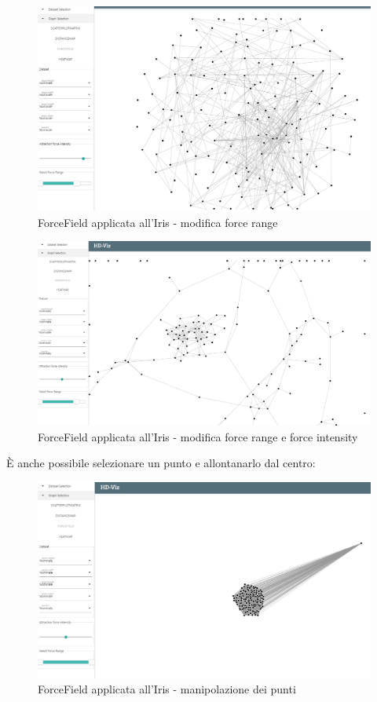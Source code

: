 \documentclass[../manuale_utente.tex]{subfiles}
\begin{document}
\begin{figure}[H]
	\centering
	\includegraphics[width=18cm]{img/ff/ff_iris_3}
	\caption{ForceField applicata all'Iris - modifica force range}
\end{figure}

\begin{figure}[H]
	\centering
	\includegraphics[width=18cm]{img/ff/ff_iris_4}
	\caption{ForceField applicata all'Iris - modifica force range e force intensity}
\end{figure}

È anche possibile selezionare un punto e allontanarlo dal centro:

\begin{figure}[H]
	\centering
	\includegraphics[width=18cm]{img/ff/ff_iris_5}
	\caption{ForceField applicata all'Iris - manipolazione dei punti}
\end{figure}
\end{document}
